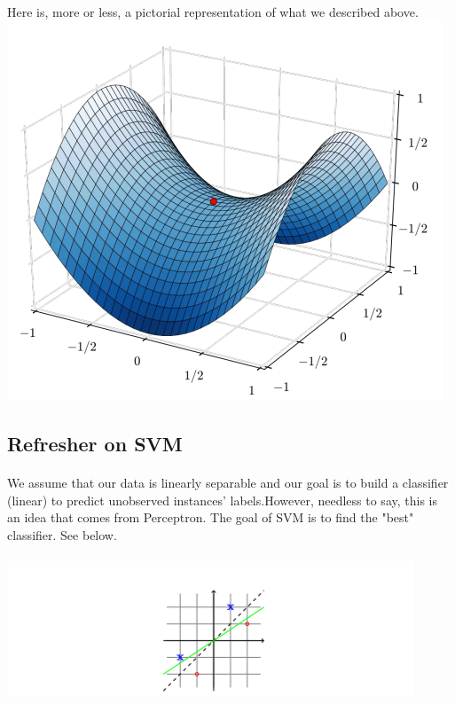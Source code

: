 \documentclass{article}
\begin{document}
\paragraph{}
Here is, more or less, a pictorial representation of what we described above.
\includegraphics[scale=1]{optimizationPic.PNG}

\subsection{Refresher on SVM}
\paragraph{}
We assume that our data is linearly separable and our goal is to build a classifier (linear) to predict unobserved instances' labels.However, needless to say, this is an idea that comes from Perceptron. The goal of SVM is to find the "best" classifier. See below.
\paragraph{}
\includegraphics[scale=1.6]{bestseparation.PNG}
\\
\end{document}
